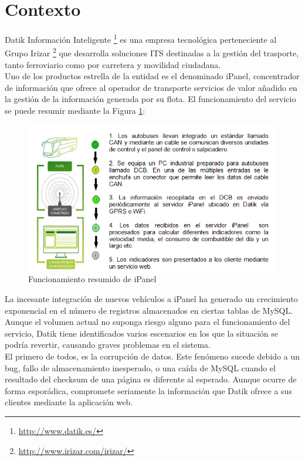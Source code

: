\section{Contexto}
 
Datik Información Inteligente \footnote{\url{http://www.datik.es/}} es una empresa tecnológica perteneciente al Grupo Irizar \footnote{\url{http://www.irizar.com/irizar/}}  que desarrolla soluciones ITS destinadas a la gestión del trasporte, tanto ferroviario como por carretera y movilidad ciudadana.\\

Uno de los productos estrella de la entidad es el denominado iPanel, concentrador de  información que ofrece al operador de transporte servicios de valor añadido en la gestión de la información generada por su flota. El funcionamiento del servicio se puede resumir mediante la Figura \ref{fig:ipanel}:\\

\begin{figure}[h]
	\centering
	\includegraphics[width=1\textwidth]{Ilustraciones/ipanel_infraesctructure.png}
	\caption{Funcionamiento resumido de iPanel}
	\label{fig:ipanel}
\end{figure}

La incesante integración de nuevos vehículos a iPanel ha generado un crecimiento exponencial en el número de registros almacenados en ciertas tablas de MySQL. Aunque el volumen actual no suponga riesgo alguno para el funcionamiento del servicio, Datik tiene identificados varios escenarios en los que la situación se podría revertir, causando graves problemas en el sistema.\\

El primero de todos, es la corrupción de datos. Este fenómeno sucede debido a un bug, fallo de almacenamiento inesperado, o una caída de MySQL cuando el resultado del checksum de una página es diferente al esperado. Aunque ocurre de forma esporádica, compromete seriamente la información que Datik ofrece a sus clientes mediante la aplicación web.\\ 

